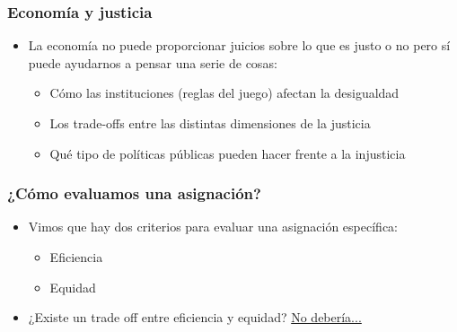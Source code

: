 \documentclass{beamer}
\begin{document}
\begin{frame}
\frametitle{Economía y justicia}
\begin{itemize}
    \item La economía no puede proporcionar juicios sobre lo que es justo o no pero sí puede ayudarnos a pensar una serie de cosas: \vspace{2mm}
    \begin{itemize}
        \item Cómo las instituciones (reglas del juego) afectan la desigualdad
        \item Los trade-offs entre las distintas dimensiones de la justicia
        \item Qué tipo de políticas públicas pueden hacer frente a la injusticia
    \end{itemize}
\end{itemize}\end{frame}

\begin{frame} 
\frametitle{¿Cómo evaluamos una asignación?}
\begin{itemize}
\item Vimos que hay dos criterios para evaluar una asignación específica: 
\begin{itemize}
    \item Eficiencia
    \item Equidad
\end{itemize}
\item ¿Existe un trade off entre eficiencia y equidad?  \href{https://www.socialeurope.eu/good-bad-inequality}{No debería...}
\end{itemize}
\end{frame}
\end{document}
